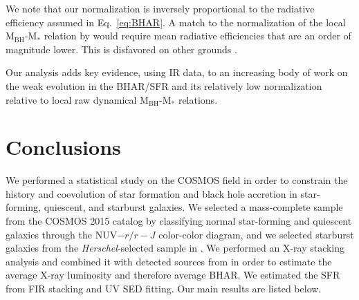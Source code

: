 We note that our normalization is inversely proportional to the radiative efficiency assumed in Eq.~\ref{eq:BHAR}. A match to the normalization of the local  M$_\text{BH}$-M$_*$ relation by \citeauthor{2016ApJS..222...10S} would require mean radiative efficiencies that are an order of magnitude lower. This is disfavored on other grounds \citep{2020MNRAS.493.1500S}. 

Our analysis adds key evidence, using IR data, to an increasing body of work \citep{2019ApJ...885L..36D,  2020ApJ...888...37D, 2020MNRAS.493.1500S, 2020ApJ...889...32S} on the weak evolution in the BHAR/SFR and its relatively low normalization relative to local raw dynamical M$_\text{BH}$-M$_*$ relations.%

\section{Conclusions} \label{sec:conclusions}
We performed a statistical study on the COSMOS field in order to constrain the history and coevolution of star formation and black hole accretion in star-forming, quiescent, and starburst galaxies. We selected a mass-complete sample from the COSMOS 2015 catalog \citep{2016ApJS..224...24L} by classifying normal star-forming and quiescent galaxies through the NUV$ - r / r - J$ color-color diagram, and we selected starburst galaxies from the \textit{Herschel}-selected sample in \citet{2013MNRAS.432...23G}. We performed an X-ray stacking analysis and combined it with detected sources from \citet{2016ApJ...819...62C} in order to estimate the average X-ray luminosity and therefore average BHAR. We estimated the SFR from FIR stacking and UV SED fitting. Our main results are listed below.

